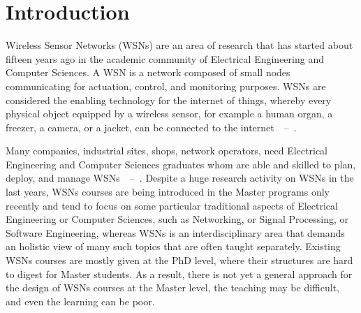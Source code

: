 \documentclass[onecolumn,12pt,draftclsnofoot,a4paper,peerreview]{IEEEtran}
\begin{document}
\section{Introduction} \label{sec:introduction}

Wireless Sensor Networks (WSNs) are an area of research that has started about fifteen years ago in the academic community of Electrical Engineering and Computer Sciences. A WSN is a network composed of small nodes communicating for actuation, control, and monitoring purposes. WSNs are considered the enabling technology for the internet of things, whereby every physical object equipped by a wireless sensor, for example a human organ, a freezer, a camera, or a jacket, can be connected to the internet~\cite{ZhaoGuibas04}~--\nocite{KarlWillig05,PottieKaiser05,Swami07,Zurawski09,ShelbyBormann09,HykinLiu10,AkyildizVuran10,DargiePoellabauer10,Ferrari10,NikoletseasRolim10}~\cite{Mazumder11}. 




Many companies, industrial sites, shops, network operators, need Electrical Engineering and Computer Sciences graduates whom are able and skilled to plan, deploy, and manage WSNs~\cite{ZhaoGuibas04}\nocite{KarlWillig05,PottieKaiser05}\nocite{Swami07,Zurawski09,ShelbyBormann09,HykinLiu10,AkyildizVuran10,DargiePoellabauer10,Ferrari10,NikoletseasRolim10,ChenNixonMok10,WagnerWattenhofer10}~--~\cite{Mazumder11}. Despite a huge research activity on WSNs in the last years, WSNs courses are being introduced in the Master programs only recently and tend to focus on some particular traditional aspects of Electrical Engineering or Computer Sciences, such as Networking, or Signal Processing, or Software Engineering, whereas WSNs is an interdisciplinary area that demands an holistic view of many such topics that are often taught separately. Existing WSNs courses are mostly given at the PhD level, where their structures are hard to digest for Master students. As a result, there is not yet a general approach for the design of WSNs courses at the Master level, the teaching may be difficult, and even the learning can be poor.  
\end{document}
